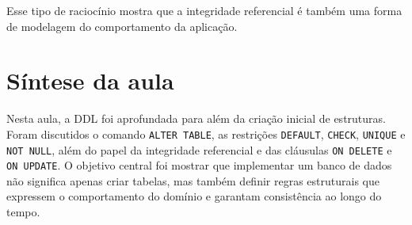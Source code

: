 Esse tipo de raciocínio mostra que a integridade referencial é também uma forma de modelagem do comportamento da aplicação.

\section{Síntese da aula}

Nesta aula, a DDL foi aprofundada para além da criação inicial de estruturas. Foram discutidos o comando \texttt{ALTER TABLE}, as restrições \texttt{DEFAULT}, \texttt{CHECK}, \texttt{UNIQUE} e \texttt{NOT NULL}, além do papel da integridade referencial e das cláusulas \texttt{ON DELETE} e \texttt{ON UPDATE}. O objetivo central foi mostrar que implementar um banco de dados não significa apenas criar tabelas, mas também definir regras estruturais que expressem o comportamento do domínio e garantam consistência ao longo do tempo.